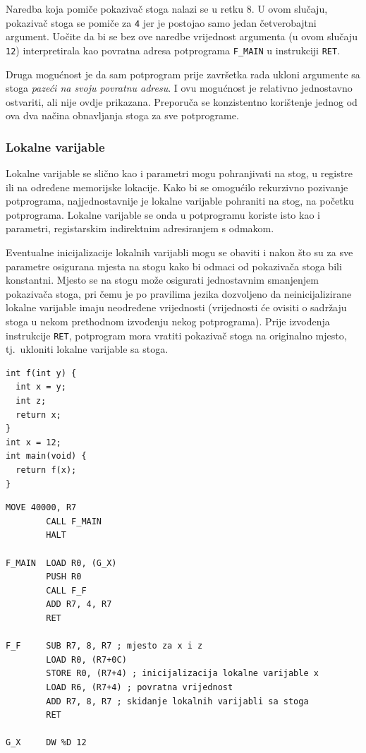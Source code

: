 \documentclass[times, 12pt, utf8]{book}
\begin{document}
Naredba koja pomiče pokazivač stoga nalazi se u retku 8.
U ovom slučaju, pokazivač stoga se pomiče za \verb|4| jer je postojao samo jedan četverobajtni argument.
Uočite da bi se bez ove naredbe vrijednost argumenta (u ovom slučaju \verb|12|) interpretirala kao povratna adresa potprograma \verb|F_MAIN| u instrukciji \verb|RET|.

Druga mogućnost je da sam potprogram prije završetka rada ukloni argumente sa stoga \emph{pazeći na svoju povratnu adresu}.
I ovu mogućnost je relativno jednostavno ostvariti, ali nije ovdje prikazana.
Preporuča se konzistentno korištenje jednog od ova dva načina obnavljanja stoga za sve potprograme.

\subsubsection{Lokalne varijable}
Lokalne varijable se slično kao i parametri mogu pohranjivati na stog, u registre ili na određene memorijske lokacije.
Kako bi se omogućilo rekurzivno pozivanje potprograma, najjednostavnije je lokalne varijable pohraniti na stog, na početku potprograma.
Lokalne varijable se onda u potprogramu koriste isto kao i parametri, registarskim indirektnim adresiranjem s odmakom.

Eventualne inicijalizacije lokalnih varijabli mogu se obaviti i nakon što su za sve parametre osigurana mjesta na stogu kako bi odmaci od pokazivača stoga bili konstantni.
Mjesto se na stogu može osigurati jednostavnim smanjenjem pokazivača stoga, pri čemu je po pravilima jezika dozvoljeno da neinicijalizirane lokalne varijable imaju neodređene vrijednosti (vrijednosti će ovisiti o sadržaju stoga u nekom prethodnom izvođenju nekog potprograma).
Prije izvođenja instrukcije \verb|RET|, potprogram mora vratiti pokazivač stoga na originalno mjesto, tj.~ukloniti lokalne varijable sa stoga.

\begin{lstlisting}[caption={Funkcija s lokalnom varijablom.},label=lst:primjer_lokalna_varijabla]
int f(int y) {
  int x = y;
  int z;
  return x;
}
int x = 12;
int main(void) {
  return f(x);
}
\end{lstlisting}

\begin{lstlisting}[caption={Mogući generirani FRISC mnemonički program za ispis \ref{lst:primjer_lokalna_varijabla}.},label=lst:primjer_lokalna_varijabla_frisc]
        MOVE 40000, R7
        CALL F_MAIN
        HALT
        
F_MAIN  LOAD R0, (G_X)
        PUSH R0
        CALL F_F
        ADD R7, 4, R7
        RET

F_F     SUB R7, 8, R7 ; mjesto za x i z
        LOAD R0, (R7+0C)
        STORE R0, (R7+4) ; inicijalizacija lokalne varijable x
        LOAD R6, (R7+4) ; povratna vrijednost
        ADD R7, 8, R7 ; skidanje lokalnih varijabli sa stoga
        RET

G_X     DW %D 12
\end{lstlisting}
\end{document}
